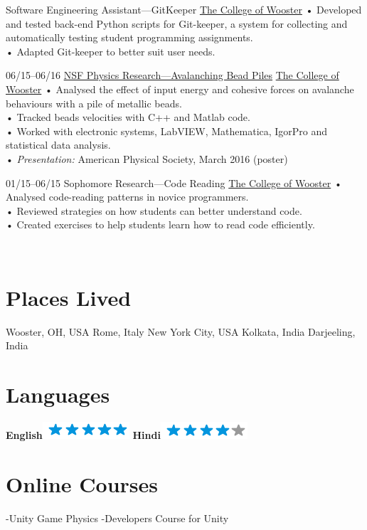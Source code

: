 \documentclass[]{friggeri-cv}
\begin{document}
\begin{entrylist} 
    {Software Engineering Assistant—GitKeeper}
    {\href{https://www.wooster.edu/}{The College of Wooster}}
    {•  Developed and tested back-end Python scripts for Git-keeper, a system for collecting and automatically testing student programming assignments. \\
    •   Adapted Git-keeper to better suit user needs.\\}
    
    \entry
    {06/15–06/16}
    {\href{http://physics.wooster.edu/REU/projects.html}{NSF Physics Research—Avalanching Bead Piles}}
    {\href{https://www.wooster.edu/}{The College of Wooster}}
    {
    •	Analysed the effect of input energy and cohesive forces on avalanche behaviours with a pile of metallic beads.\\
    •	Tracked beads velocities with C++ and Matlab code. \\
    •   Worked with electronic systems, LabVIEW, Mathematica, IgorPro and statistical data analysis.\\
    •	\emph{Presentation:} American Physical Society, March 2016 (poster)\\}
   
    \entry
    {01/15–06/15}
    {Sophomore Research—Code Reading}
    {\href{https://www.wooster.edu/}{The College of Wooster}}
    {
    •	Analysed code-reading patterns in novice programmers.\\
    •	Reviewed strategies on how students can better understand code.\\
    •	Created exercises to help students learn how to read code efficiently.\\
    }
\end{entrylist}

\begin{aside}
~
~
~
~
  \section{Places Lived}
Wooster, OH, USA
Rome, Italy
New York City, USA 
Kolkata, India
Darjeeling, India
~
~
~
~
\section{Languages}
\textbf{English}\includegraphics[scale=0.40]{img/5stars.png}
\textbf{Hindi}\includegraphics[scale=0.40]{img/4stars.png}
    ~
    ~
    ~
    ~
    \section{Online Courses}
    -Unity Game Physics
    -Developers Course for Unity
    ~
~
~
\end{aside}
\end{document}
